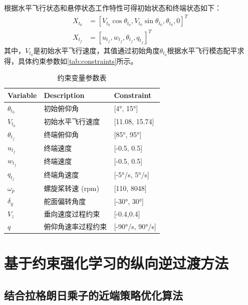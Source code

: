 根据水平飞行状态和悬停状态工作特性可得初始状态和终端状态如下：
\begin{align}
    X_{t_{0}} &=\left [ V_{t_{0}}\cos \theta_{t_{0}},V_{t_{0}}\sin \theta_{t_{0}},\theta_{t_{0}},0 \right]^{T}\\
    X_{t_{f}} &=\left [ u_{t_{f}},w_{t_{f}},\theta_{t_{f}},q_{t_{f}}\right]^{T}
\end{align}
其中，$V_{t_{0}}$是初始水平飞行速度，其值通过初始角度$\theta_{t_{0}}$根据水平飞行模态配平求得，具体约束参数如\autoref{tab:constraints}所示。
\begin{table}[htbp]
    \centering
    \caption{约束变量参数表}
    \label{tab:constraints}
    \begin{tabular*}{0.8\textwidth}{@{\extracolsep{\fill}}lll}
        \toprule
        Variable & Description & Constraint \\
        \midrule
        \( \theta_{t_{0}} \) & 初始俯仰角 & [4°, 15°] \\
        \( V_{t_{0}} \) & 初始水平飞行速度 & [11.08, 15.74] \\
        \( \theta_{t_{f}} \) & 终端俯仰角 & [85°, 95°] \\
        \( u_{t_{f}} \) & 终端速度 & [-0.5, 0.5] \\
        \( w_{t_{f}} \) & 终端速度 & [-0.5, 0.5] \\
        \( q_{t_{f}} \) & 终端角速度 & [-5°/s, 5°/s] \\
        \( \omega _{p} \) & 螺旋桨转速 (rpm) & [110, 8048] \\
        \( \delta _{y} \) & 舵面偏转角度 & [-30°, 30°] \\
        \( V_{z} \) & 垂向速度过程约束 & [-0.4,0.4] \\
        \( q \) & 俯仰角速率过程约束 & [-90°/s, 90°/s] \\
        \bottomrule
    \end{tabular*}
\end{table}
\section{基于约束强化学习的纵向逆过渡方法}
\subsection{结合拉格朗日乘子的近端策略优化算法}
\label{chapter:algorithm}
